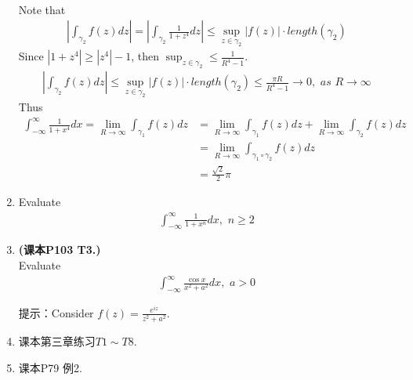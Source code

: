 \begin{enumerate}
\begin{solution}
\begin{align}
			\end{align}
			Note that
			\begin{align}
				\left| \int_{\gamma_2}{f(z) dz} \right| 
				= \left| \int_{\gamma_2}{\frac{1}{1 + z^4} dz} \right|
				\leq  \sup_{z \in \gamma_2}{\left| f(z) \right|} \cdot length(\gamma_2)
			\end{align}
			Since $\left| 1 + z^4 \right| \geq \left| z^4 \right| - 1$, then $\sup_{z \in \gamma_2} \leq \frac{1}{R^4 - 1}$.
			\begin{align}
				\left| \int_{\gamma_2}{f(z) dz} \right|
				\leq \sup_{z \in \gamma_2}{\left| f(z) \right|} \cdot length(\gamma_2)
				\leq \frac{\pi R}{R^4 - 1} \to 0 , \,\, as \,\, R \to \infty
			\end{align}
			Thus
			\begin{align}
				\int_{-\infty}^{\infty}{\frac{1}{1 + x^4} dx} 
				= \lim_{R \to \infty}{\int_{\gamma_1}{f(z) dz}}
				&= \lim_{R \to \infty}{\int_{\gamma_1}{f(z) dz}} + \lim_{R \to \infty}{\int_{\gamma_2}{f(z) dz}} \\
				&= \lim_{R \to \infty}{\int_{\gamma_1 \circ \gamma_2}{f(z) dz}} \\
				&= \frac{\sqrt{2}}{2} \pi
			\end{align}
		\end{solution}
	
		\newpage
		
		\item Evaluate
		\begin{align}
			\int_{-\infty}^{\infty}{\frac{1}{1 + x^n} dx} , \,\, n \geq 2
		\end{align}
	
		\vspace{2em}
		
		\item \textbf{(课本P103 T3.)}\\
		Evaluate
		\begin{align}
			\int_{-\infty}^{\infty}{\frac{\cos{x}}{x^2 + a^2} dx} , \,\, a > 0
		\end{align}
	
		\vspace{2em}
		\begin{solution}
			提示：Consider $f(z) = \frac{e^{iz}}{z^2 + a^2}$.
		\end{solution}
		
		\vspace{2em}
		
		\item 课本第三章练习$T1 \sim T8$.
		
		\vspace{2em}
		
		\item 课本P79 例2.
	\end{enumerate}



